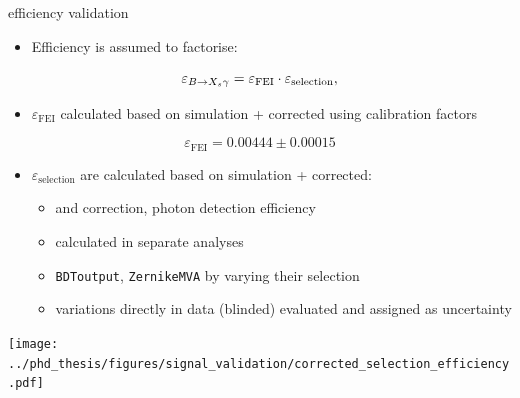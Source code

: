 \documentclass[xcolor=dvipsnames]{beamer}
\begin{document}
\begin{frame}{\BtoXsgamma efficiency validation}
\scriptsize\centering
\begin{itemize}
   \item Efficiency is assumed to factorise:
\end{itemize}
\begin{equation*}
   \varepsilon_{\BtoXsgamma} = \varepsilon_{\mathrm{FEI}} \cdot \varepsilon_{\mathrm{selection}},
\end{equation*}

\vspace{-5pt}

\begin{itemize}
   \item $\varepsilon_{\mathrm{FEI}}$ calculated based on simulation + corrected using calibration factors
\end{itemize}
\begin{equation*}
   \varepsilon_{\mathrm{FEI}} = 0.00444\pm0.00015
\end{equation*}
\begin{itemize}
   \item $\varepsilon_{\mathrm{selection}}$ are calculated based on simulation + corrected:
   \begin{itemize}
      \scriptsize
      \item \piVeto and \etaVeto correction, photon detection efficiency 
      \item[\ra] calculated in separate analyses\\
      \vspace{5pt}
      \item \texttt{BDToutput}, \texttt{ZernikeMVA} by varying their selection 
      \item[\ra] variations directly in data (blinded) evaluated and assigned as uncertainty
   \end{itemize}
\end{itemize}
\texttt{[image: ../phd\_thesis/figures/signal\_validation/corrected\_selection\_efficiency.pdf]}



\end{frame}
\end{document}
